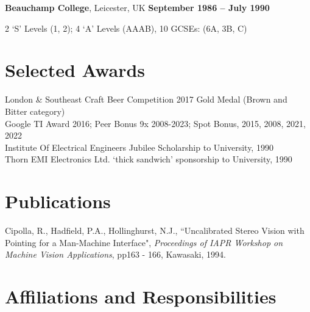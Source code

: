 \documentclass[line]{resume}
\begin{document}
\begin{resume}
    \textbf{Beauchamp College}, Leicester, UK\hfill \textbf{ September 1986 -- July 1990}\vspace{-3mm}\\\vspace{-1mm}%
    \begin{list2}
        \item 2 `S' Levels (1, 2); 4 `A' Levels (AAAB), 10 GCSEs: (6A, 3B, C)
    \end{list2}\vspace{-1.5mm}

    \section{\mysidestyle Selected Awards}

    London \& Southeast Craft Beer Competition 2017 Gold Medal (Brown and Bitter category)            \vspace{0.5mm}\\%
    Google TI Award 2016; Peer Bonus 9x 2008-2023; Spot Bonus, 2015, 2008, 2021, 2022                 \vspace{0.5mm}\\%
    Institute Of Electrical Engineers Jubilee Scholarship to University, 1990                         \vspace{0.5mm}\\%
    Thorn EMI Electronics Ltd. `thick sandwich' sponsorship to University, 1990

    \section{\mysidestyle Publications}

    Cipolla, R., Hadfield, P.A., Hollinghurst, N.J.,
    ``Uncalibrated Stereo Vision with Pointing for a Man-Machine Interface",
    \textsl{Proceedings of IAPR Workshop on Machine Vision Applications}, pp163 - 166, Kawasaki, 1994.

    \section{\mysidestyle Affiliations and Responsibilities}


\end{resume}
\end{document}
